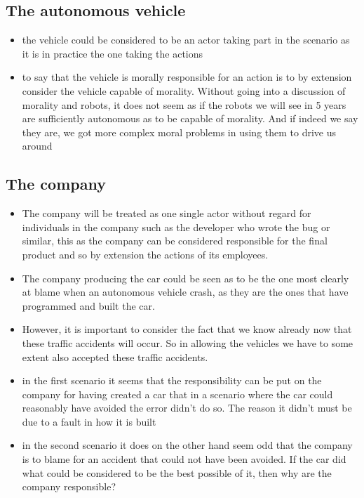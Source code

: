 \subsection{The autonomous vehicle}
\begin{itemize}
\item the vehicle could be considered to be an actor taking part in the scenario as
it is in practice the one taking the actions
\item to say that the vehicle is morally responsible for an action is to by
extension consider the vehicle capable of morality. Without going into a
discussion of morality and robots, it does not seem as if the robots we will see
in 5 years are sufficiently autonomous as to be capable of morality. And if
indeed we say they are, we got more complex moral problems in using them to
drive us around
\end{itemize}

\subsection{The company}
\begin{itemize}
\item The company will be treated as one single actor without regard for
  individuals in the company such as the developer who wrote the bug or similar,
  this as the company can be considered responsible for the final product and so
  by extension the actions of its employees.
\item The company producing the car could be seen as to be the one most clearly
  at blame when an autonomous vehicle crash, as they are the ones that have
  programmed and built the car.
\item However, it is important to consider the fact that we know already now
  that these traffic accidents will occur. So in allowing the vehicles we have
  to some extent also accepted these traffic accidents.
\item in the first scenario it seems that the responsibility can be put on the
  company for having created a car that in a scenario where the car could
  reasonably have avoided the error didn't do so. The reason it didn't must be
  due to a fault in how it is built
\item in the second scenario it does on the other hand seem odd that the company
  is to blame for an accident that could not have been avoided. If the car did
  what could be considered to be the best possible of it, then why are the
  company responsible?
\end{itemize}

